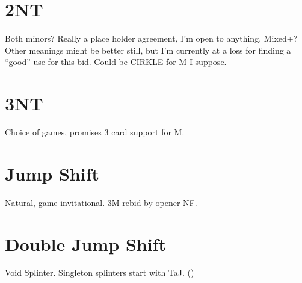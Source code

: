\documentclass[tom-ari]{subfile}
\begin{document}
	
	\section{2NT}
	
	Both minors?  Really a place holder agreement, I'm open to anything. Mixed+? Other meanings might be better still, but I'm currently at a loss for finding a ``good'' use for this bid. Could be CIRKLE for M I suppose.
	
	\section{3NT}
	
	Choice of games, promises 3 card support for M.
	
	\section{Jump Shift}
	
	Natural, game invitational. 3M rebid by opener NF.
	
	\section{Double Jump Shift}
	
	Void Splinter. Singleton splinters start with TaJ. ()
		
\end{document}

